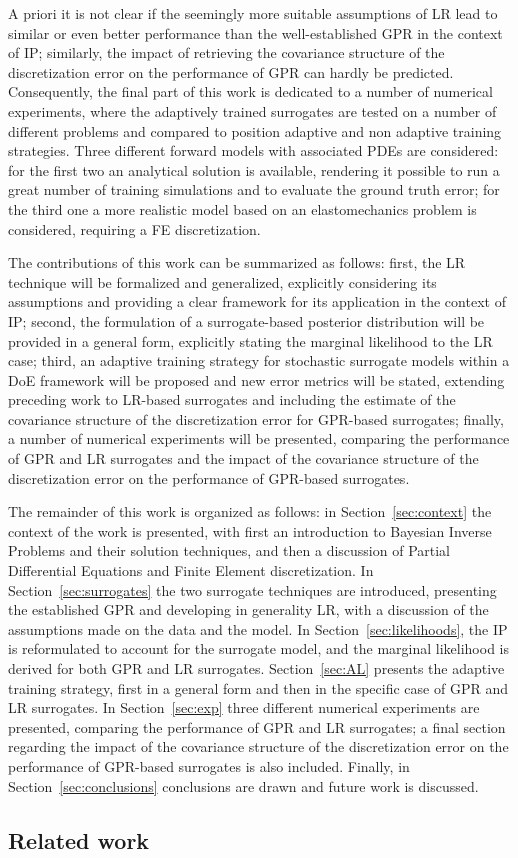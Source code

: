 A priori it is not clear if the seemingly more suitable assumptions of LR lead to similar or even better performance than the well-established GPR in the context of IP; similarly, the impact of retrieving the covariance structure of the discretization error on the performance of GPR can hardly be predicted.
Consequently, the final part of this work is dedicated to a number of numerical experiments, where the adaptively trained surrogates are tested on a number of different problems and compared to position adaptive and non adaptive training strategies.
Three different forward models with associated PDEs are considered: for the first two an analytical solution is available, rendering it possible to run a great number of training simulations and to evaluate the ground truth error; for the third one a more realistic model based on an elastomechanics problem is considered, requiring a FE discretization.\medskip

The contributions of this work can be summarized as follows: first, the LR technique will be formalized and generalized, explicitly considering its assumptions and providing a clear framework for its application in the context of IP; second, the formulation of a surrogate-based posterior distribution will be provided in a general form, explicitly stating the marginal likelihood to the LR case; third, an adaptive training strategy for stochastic surrogate models within a DoE framework will be proposed and new error metrics will be stated, extending preceding work to LR-based surrogates and including the estimate of the covariance structure of the discretization error for GPR-based surrogates; finally, a number of numerical experiments will be presented, comparing the performance of GPR and LR surrogates and the impact of the covariance structure of the discretization error on the performance of GPR-based surrogates.\medskip

The remainder of this work is organized as follows: in Section~\ref{sec:context} the context of the work is presented, with first an introduction to Bayesian Inverse Problems and their solution techniques, and then a discussion of Partial Differential Equations and Finite Element discretization.
In Section~\ref{sec:surrogates} the two surrogate techniques are introduced, presenting the established GPR and developing in generality LR, with a discussion of the assumptions made on the data and the model.
In Section~\ref{sec:likelihoods}, the IP is reformulated to account for the surrogate model, and the marginal likelihood is derived for both GPR and LR surrogates.
Section~\ref{sec:AL} presents the adaptive training strategy, first in a general form and then in the specific case of GPR and LR surrogates.
In Section~\ref{sec:exp} three different numerical experiments are presented, comparing the performance of GPR and LR surrogates; a final section regarding the impact of the covariance structure of the discretization error on the performance of GPR-based surrogates is also included.
Finally, in Section~\ref{sec:conclusions} conclusions are drawn and future work is discussed.

\subsection{Related work}\label{sec:literature}
